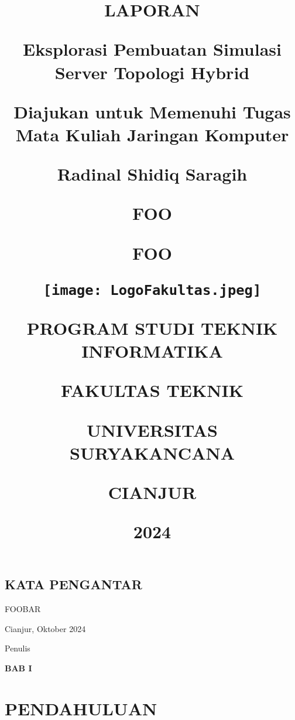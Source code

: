 \documentclass[12pt, a4paper]{article}
\date{}
\title{

  \LARGE{\textbf{LAPORAN}}

  {\vspace{1cm}}

  \large{\textbf{Eksplorasi Pembuatan Simulasi Server Topologi Hybrid}}

  {\large{Diajukan untuk Memenuhi Tugas Mata Kuliah Jaringan Komputer}}

  {\vspace{1cm}}

  \normalsize{Radinal Shidiq Saragih}

  \normalsize{FOO}

  \normalsize{FOO}

  {\vspace{1cm}}

  {\texttt{[image: LogoFakultas.jpeg]}}

  {\vspace{2cm}}

  {\large{PROGRAM STUDI TEKNIK INFORMATIKA}}

  {\large{FAKULTAS TEKNIK}}

  {\large{UNIVERSITAS SURYAKANCANA}}

  {\large{CIANJUR}}

  {\small{2024}}
}
\begin{document}
  \begin{titlepage}
    \maketitle
  \end{titlepage}


  \begin{center}
    \section*{KATA PENGANTAR}
  \end{center}

  \setcounter{section}{1}

  \setcounter{subsection}{0}



  \vspace{1cm}

  FOOBAR

  \vspace{1cm}

  \begin{flushright}
    Cianjur, Oktober 2024

    \vspace{0.5cm}

    Penulis
  \end{flushright}

  \newpage

  \renewcommand\contentsname {\Large{\textbf{DAFTAR ISI}} }

  \begin{center}
  \tableofcontents
  \end{center}

  \newpage
  


  \begin{center}
    \large{\textbf{BAB I}}

    \section*{PENDAHULUAN}
  \end{center}
  \vspace{1cm}
  \setcounter{section}{1}
  \setcounter{subsection}{0}
\end{document}
